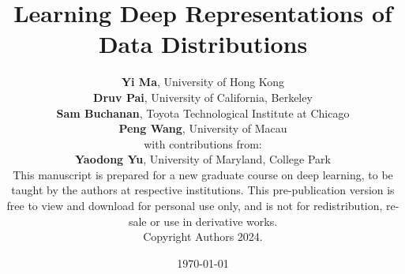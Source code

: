 \documentclass{book}
\numberwithin{equation}{section}
\begin{document}
\title{Learning Deep Representations of Data Distributions}

\author{\vspace{0.5cm}
	\textbf{Yi Ma},  University of Hong Kong \vspace{3mm}\\
	\textbf{Druv Pai}, University of California, Berkeley \vspace{3mm} \\
    \textbf{Sam Buchanan}, Toyota Technological Institute at Chicago     \vspace{3mm}\\
    \textbf{Peng Wang}, 
    University of Macau \vspace{10mm} \\
    with contributions from:\vspace{3mm}\\
    \textbf{Yaodong Yu},  University of Maryland, College Park
	\vspace{8cm}\\
	\footnotesize
	This manuscript is prepared for a new graduate course on deep learning, to be taught by the authors at respective institutions. This pre-publication version is free to view and download for personal use only, and is not for redistribution, re-sale or use in derivative works.\\  Copyright Authors 2024.
}

\date{\large \today}

\frontmatter
\titlepage
\thispagestyle{empty}
\maketitle
\cleardoublepage

% 

% 
\end{document}
